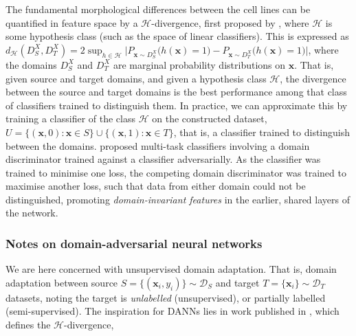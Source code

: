 The fundamental morphological differences between the cell lines can be quantified in feature space by a $\mathcal{H}$-divergence, first proposed by \cite{ben2010theory}, where $\mathcal{H}$ is some hypothesis class (such as the space of linear classifiers). This is expressed as $d_\mathcal{H}(D_S^X, D_T^X) = 2\sup_{h \in \mathcal{H}}\Big|P_{\mathbf{x} \sim D_S^X}\big(h(\mathbf{x})= 1\big) - P_{\mathbf{x} \sim D_T^X}\big(h(\mathbf{x}) = 1\big)\Big|$, where the domains $D_S^X$ and $D_T^X$ are marginal probability distributions on $\mathbf{x}$. That is, given source and target domains, and given a hypothesis class $\mathcal{H}$, the divergence between the source and target domains is the best performance among that class of classifiers trained to distinguish them. In practice, we can approximate this by training a classifier of the class $\mathcal{H}$ on the constructed dataset, $U = \{(\mathbf{x}, 0) : \mathbf{x} \in S\} \cup \{(\mathbf{x}, 1) : \mathbf{x} \in T\}$, that is, a classifier trained to distinguish between the domains.
\cite{ajakan2014domain} proposed multi-task classifiers involving a domain discriminator trained against a classifier adversarially. As the classifier was trained to minimise one loss, the competing domain discriminator was trained to maximise another loss, such that data from either domain could not be distinguished, promoting \emph{domain-invariant features} in the earlier, shared layers of the network.

\subsubsection{Notes on domain-adversarial neural networks}
\label{subsubsec:adversarial_notes}



We are here concerned with unsupervised domain adaptation. That is, domain adaptation between source $S = \{(\mathbf{x}_i, y_i)\} \sim \mathcal{D}_S$ and target $T = \{\mathbf{x}_i\} \sim \mathcal{D}_T$ datasets, noting the target is \emph{unlabelled} (unsupervised), or partially labelled (semi-supervised). The inspiration for DANNs lies in work published in \cite{ben2010theory}, which defines the $\mathcal{H}$-divergence,

